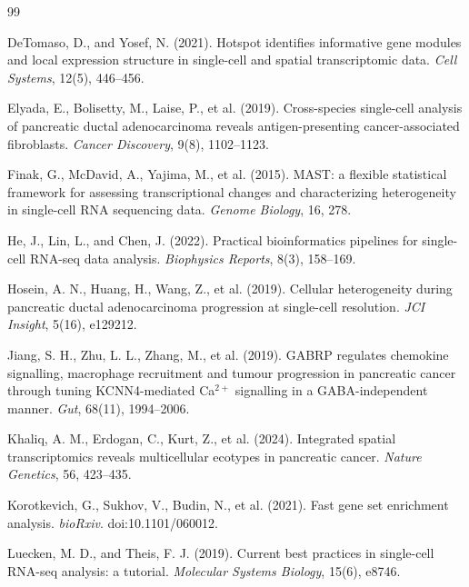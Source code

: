 \documentclass[11pt,a4paper]{article}
\begin{document}
\clearpage
{}
{}
\begin{thebibliography}{99}

DeTomaso, D., and Yosef, N. (2021). Hotspot identifies informative gene modules and local expression structure in single-cell and spatial transcriptomic data. \textit{Cell Systems}, 12(5), 446--456.

Elyada, E., Bolisetty, M., Laise, P., et al. (2019). Cross-species single-cell analysis of pancreatic ductal adenocarcinoma reveals antigen-presenting cancer-associated fibroblasts. \textit{Cancer Discovery}, 9(8), 1102--1123.

Finak, G., McDavid, A., Yajima, M., et al. (2015). MAST: a flexible statistical framework for assessing transcriptional changes and characterizing heterogeneity in single-cell RNA sequencing data. \textit{Genome Biology}, 16, 278.

He, J., Lin, L., and Chen, J. (2022). Practical bioinformatics pipelines for single-cell RNA-seq data analysis. \textit{Biophysics Reports}, 8(3), 158--169.

Hosein, A. N., Huang, H., Wang, Z., et al. (2019). Cellular heterogeneity during pancreatic ductal adenocarcinoma progression at single-cell resolution. \textit{JCI Insight}, 5(16), e129212.

Jiang, S. H., Zhu, L. L., Zhang, M., et al. (2019). GABRP regulates chemokine signalling, macrophage recruitment and tumour progression in pancreatic cancer through tuning KCNN4-mediated Ca$^{2+}$ signalling in a GABA-independent manner. \textit{Gut}, 68(11), 1994--2006.

Khaliq, A. M., Erdogan, C., Kurt, Z., et al. (2024). Integrated spatial transcriptomics reveals multicellular ecotypes in pancreatic cancer. \textit{Nature Genetics}, 56, 423--435.

Korotkevich, G., Sukhov, V., Budin, N., et al. (2021). Fast gene set enrichment analysis. \textit{bioRxiv}. doi:10.1101/060012.

Luecken, M. D., and Theis, F. J. (2019). Current best practices in single-cell RNA-seq analysis: a tutorial. \textit{Molecular Systems Biology}, 15(6), e8746.


\end{thebibliography}
\end{document}
